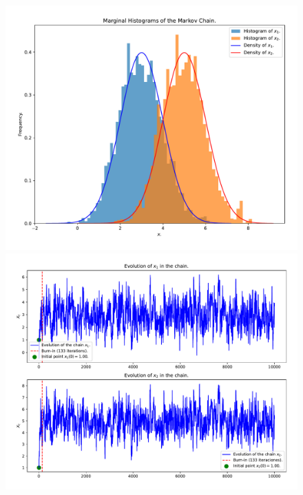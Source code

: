 \begin{figure}[h!]
	\centering
	\begin{minipage}{0.495\textwidth}
		\centering
		\includegraphics[width=\textwidth]{IMAGENES/ex3/histograms_example1.pdf}
	\end{minipage}
	\hfill
	\begin{minipage}{0.495\textwidth}
		\centering
		\includegraphics[width=\textwidth]{IMAGENES/ex3/evolution_example1.pdf}
	\end{minipage}
\end{figure}

